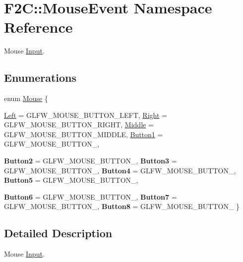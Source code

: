 \hypertarget{namespace_f2_c_1_1_mouse_event}{
\section{F2C::MouseEvent Namespace Reference}
\label{namespace_f2_c_1_1_mouse_event}
}


Mouse \hyperlink{class_f2_c_1_1_input}{Input}.  
\subsection*{Enumerations}
\begin{DoxyCompactItemize}
\item 
enum \hyperlink{namespace_f2_c_1_1_mouse_event_ad51c859ddf42f97a3c31fb60c21821a8}{Mouse} \{ \par
\hyperlink{namespace_f2_c_1_1_mouse_event_ad51c859ddf42f97a3c31fb60c21821a8a1808883a9ecc9dae87e1dd1c897b9686}{Left} =  GLFW\_\-MOUSE\_\-BUTTON\_\-LEFT, 
\hyperlink{namespace_f2_c_1_1_mouse_event_ad51c859ddf42f97a3c31fb60c21821a8af631815d2f2d0ff415970320fddaa856}{Right} =  GLFW\_\-MOUSE\_\-BUTTON\_\-RIGHT, 
\hyperlink{namespace_f2_c_1_1_mouse_event_ad51c859ddf42f97a3c31fb60c21821a8acd570ee5d756fe60904cbda093fead5f}{Middle} =  GLFW\_\-MOUSE\_\-BUTTON\_\-MIDDLE, 
\hyperlink{namespace_f2_c_1_1_mouse_event_ad51c859ddf42f97a3c31fb60c21821a8a0976f4119272f5d4f6333cb5e7204b87}{Button1} =  GLFW\_\-MOUSE\_\-BUTTON\_, 
\par
{\bfseries Button2} =  GLFW\_\-MOUSE\_\-BUTTON\_, 
{\bfseries Button3} =  GLFW\_\-MOUSE\_\-BUTTON\_, 
{\bfseries Button4} =  GLFW\_\-MOUSE\_\-BUTTON\_, 
{\bfseries Button5} =  GLFW\_\-MOUSE\_\-BUTTON\_, 
\par
{\bfseries Button6} =  GLFW\_\-MOUSE\_\-BUTTON\_, 
{\bfseries Button7} =  GLFW\_\-MOUSE\_\-BUTTON\_, 
{\bfseries Button8} =  GLFW\_\-MOUSE\_\-BUTTON\_
 \}
\end{DoxyCompactItemize}


\subsection{Detailed Description}
Mouse \hyperlink{class_f2_c_1_1_input}{Input}. 

